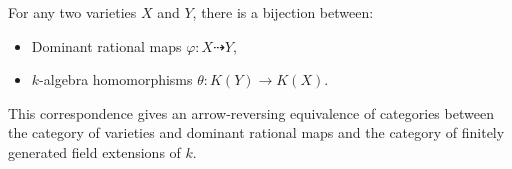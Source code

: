 For any two varieties $X$ and $Y$, there is a bijection between:
\begin{itemize}
\item Dominant rational maps $\varphi: X \dashrightarrow Y$,
\item $k$-algebra homomorphisms $\theta: K(Y) \to K(X)$.
\end{itemize}
This correspondence gives an arrow-reversing equivalence of categories between the category of varieties and dominant rational maps and the category of finitely generated field extensions of $k$.
